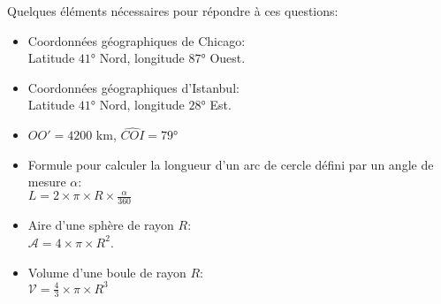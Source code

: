 \begin{changemargin}{-5mm}{-10mm}
\begin{remarque}
    Quelques éléments nécessaires pour répondre à ces questions:
    \begin{itemize}
        \item  Coordonnées géographiques de Chicago:\\
        Latitude $\ang{41}$ Nord, longitude $\ang{87}$ Ouest.
        \item  Coordonnées géographiques d'Istanbul:\\
        Latitude $\ang{41}$ Nord, longitude $\ang{28}$ Est.
        \item  $OO'=4200$ km, $\widehat{COI}=\ang{79}$
        \item  Formule pour calculer la longueur d'un arc de cercle défini par un angle de mesure $\alpha$:\\ $L=2\times\pi\times R\times\frac{\alpha}{360}$
        \item  Aire d'une sphère de rayon $R$:\\
        $\mathcal{A}=4\times\pi\times R^2$.
        \item  Volume d'une boule de rayon $R$:\\
        $\mathcal{V}=\frac{4}{3}\times\pi\times R^3$
    \end{itemize}
\end{remarque}

\end{changemargin}
